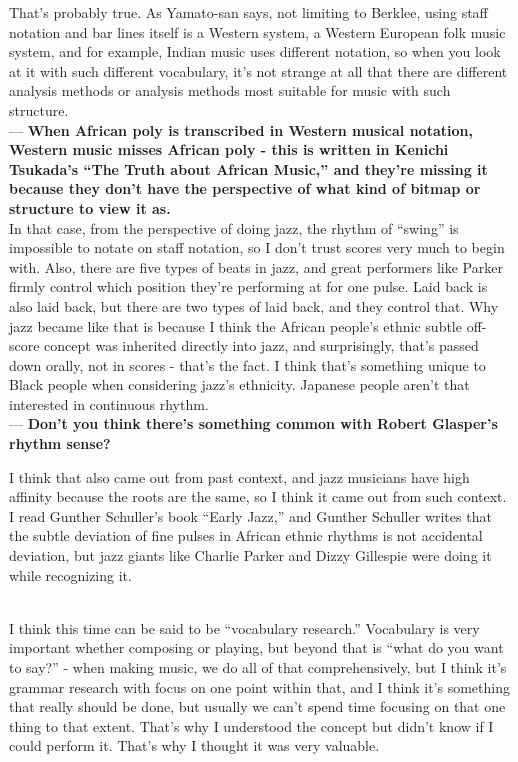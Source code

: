 \begin{description}
That's probably true. As Yamato-san says, not limiting to Berklee, using staff notation and bar lines itself is a Western system, a Western European folk music system, and for example, Indian music uses different notation, so when you look at it with such different vocabulary, it's not strange at all that there are different analysis methods or analysis methods most suitable for music with such structure.\\

--- {\bf When African poly is transcribed in Western musical notation, Western music misses African poly - this is written in Kenichi Tsukada's ``The Truth about African Music,'' and they're missing it because they don't have the perspective of what kind of bitmap or structure to view it as.}\\

In that case, from the perspective of doing jazz, the rhythm of ``swing'' is impossible to notate on staff notation, so I don't trust scores very much to begin with. Also, there are five types of beats in jazz, and great performers like Parker firmly control which position they're performing at for one pulse. Laid back is also laid back, but there are two types of laid back, and they control that. Why jazz became like that is because I think the African people's ethnic subtle off-score concept was inherited directly into jazz, and surprisingly, that's passed down orally, not in scores - that's the fact. I think that's something unique to Black people when considering jazz's ethnicity. Japanese people aren't that interested in continuous rhythm.\\

--- {\bf Don't you think there's something common with Robert Glasper's rhythm sense?}

I think that also came out from past context, and jazz musicians have high affinity because the roots are the same, so I think it came out from such context. I read Gunther Schuller's book ``Early Jazz,'' and Gunther Schuller writes that the subtle deviation of fine pulses in African ethnic rhythms is not accidental deviation, but jazz giants like Charlie Parker and Dizzy Gillespie were doing it while recognizing it.\\

\item [Is there any difference compared to what you usually do?]\mbox{}\\

I think this time can be said to be ``vocabulary research.'' Vocabulary is very important whether composing or playing, but beyond that is ``what do you want to say?'' - when making music, we do all of that comprehensively, but I think it's grammar research with focus on one point within that, and I think it's something that really should be done, but usually we can't spend time focusing on that one thing to that extent. That's why I understood the concept but didn't know if I could perform it. That's why I thought it was very valuable.\\


\end{description}
